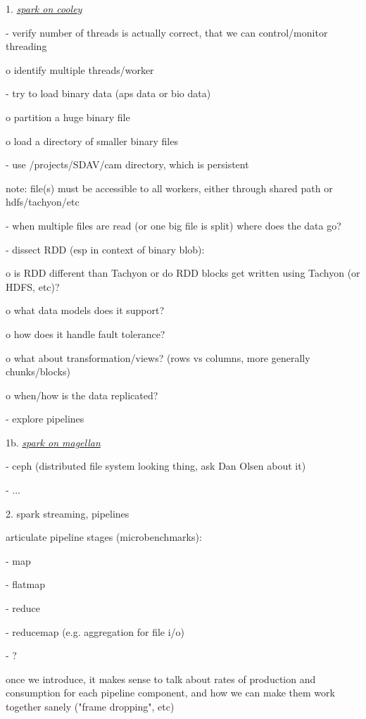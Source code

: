 1.
\href{https://docs.google.com/document/d/1fq3z1-oEcCBhjKA__vl8LsVm3-uArJik7YFLYvYoN1Y/edit?usp=sharing}{\emph{spark
on cooley}}

- verify number of threads is actually correct, that we can
control/monitor threading

o identify multiple threads/worker

- try to load binary data (aps data or bio data)

o partition a huge binary file

o load a directory of smaller binary files

- use /projects/SDAV/cam directory, which is persistent

note: file(s) must be accessible to all workers, either through shared
path or hdfs/tachyon/etc

- when multiple files are read (or one big file is split) where does the
data go?

- dissect RDD (esp in context of binary blob):

o is RDD different than Tachyon or do RDD blocks get written using
Tachyon (or HDFS, etc)?

o what data models does it support?

o how does it handle fault tolerance?

o what about transformation/views? (rows vs columns, more generally
chunks/blocks)

o when/how is the data replicated?

- explore pipelines

1b.
\href{https://docs.google.com/document/d/1lyzEHap1EznES0DKiMa3fsalepqPD6vnbZqSEMjCVPQ/edit?usp=sharing}{\emph{spark
on magellan}}

- ceph (distributed file system looking thing, ask Dan Olsen about it)

- ...

2. spark streaming, pipelines

articulate pipeline stages (microbenchmarks):

- map

- flatmap

- reduce

- reducemap (e.g. aggregation for file i/o)

- ?

once we introduce, it makes sense to talk about rates of production and
consumption for each pipeline component, and how we can make them work
together sanely ("frame dropping", etc)

